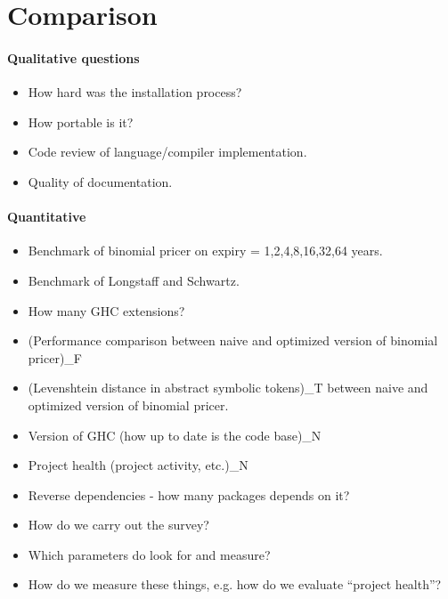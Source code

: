 
\section{Comparison}

\paragraph{Qualitative questions}
\begin{itemize}
\item How hard was the installation process?
\item How portable is it?
\item Code review of language/compiler implementation.
\item Quality of documentation.
\end{itemize}
\paragraph{Quantitative}
\begin{itemize}
\item Benchmark of binomial pricer on expiry = 1,2,4,8,16,32,64 years.
\item Benchmark of Longstaff and Schwartz.
\item How many GHC extensions?
\item (Performance comparison between naive and optimized version of
  binomial pricer)\_F
\item (Levenshtein distance in abstract symbolic tokens)\_T between
  naive and optimized version of binomial pricer.
\item Version of GHC (how up to date is the code base)\_N
\item Project health (project activity, etc.)\_N
\item Reverse dependencies - how many packages
  depends on it?
\end{itemize}

\begin{itemize}
\item How do we carry out the survey?
\item Which parameters do look for and measure?
\item How do we measure these things, e.g. how do we evaluate ``project health''?
\end{itemize}

